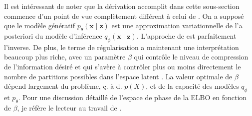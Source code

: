 Il est intéressant de noter que la dérivation accomplit dans cette sous-section commence d'un point de vue complètement différent à 
celui de \citet{Kingma2013}. On 
a supposé que le modèle génératif $p_\theta(\mathbf{x} \mid \mathbf{z})$ est une approximation variationnelle de 
l'a posteriori du modèle 
d'inférence $q_\phi(\mathbf{x} \mid \mathbf{z})$. L'approche de \citet{Kingma2013} est parfaitement l'inverse.
De plus, le terme de régularisation a maintenant une interprétation beaucoup plus riche, avec un paramètre 
$\beta$ qui contrôle le niveau de compression de l'information désiré et qui s'avère à contrôler plus ou moins 
directement le nombre de partitions possibles dans l'espace latent \citep{Alemi2017,Rezende2018}.
La valeur optimale de $\beta$ dépend largement du problème, ç.-à-d. $p(X)$, et de 
la capacité des modèles $q_\phi$ et $p_\theta$. 
Pour une discussion détaillé de l'espace de phase de la ELBO en fonction de $\beta$, je réfère le lecteur 
au travail de \citet{Alemi2018}.




